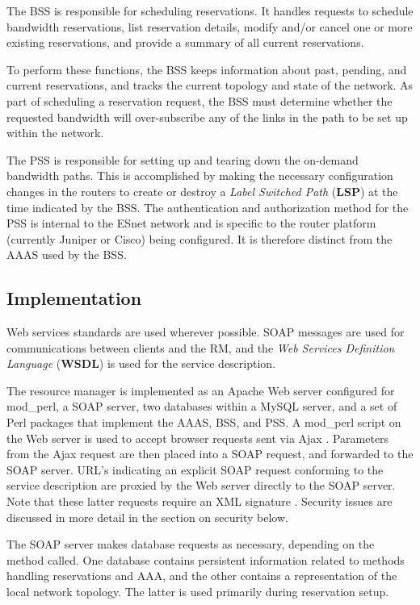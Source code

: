 \documentclass[conference]{IEEEtran}
\begin{document}
The BSS is responsible for scheduling reservations.  It handles
requests to schedule bandwidth reservations, list reservation details,
modify and/or cancel one or more existing reservations, and provide a summary
of all current reservations.

To perform these functions, the BSS keeps information about past,
pending, and current reservations, and tracks the current topology and state of
the network.  As part of scheduling a reservation request, the BSS must
determine whether the requested bandwidth will over-subscribe any of the links
in the path to be set up within the network.

The PSS is responsible for setting up and tearing down the on-demand bandwidth 
paths. This is accomplished by making the necessary configuration changes in 
the routers to create or destroy a \emph{Label Switched Path }(\textbf{LSP}) at the time
indicated by the BSS. The authentication and authorization method for the PSS 
is internal to the ESnet network and is specific to the router platform 
(currently Juniper or Cisco) being configured.  It is therefore distinct from 
the AAAS used by the BSS.

\subsection{Implementation}

Web services standards are used wherever possible.  SOAP \cite{SOAP} messages are
used for communications between clients and the RM, and 
the \emph{Web Services Definition Language} (\textbf{WSDL}) \cite{WSDL} is used for the service description.
 
The resource manager is implemented as an Apache Web server configured for
mod\_perl, a SOAP server, two databases within a MySQL server, and a set of 
Perl packages that implement the AAAS, BSS, and PSS.  A mod\_perl script on
the Web server is used to accept browser requests sent via Ajax \cite{Ajax}.
Parameters from the Ajax request are then placed into a SOAP request, and
forwarded to the SOAP server.
URL's indicating an explicit SOAP request conforming to the service 
description are proxied by the Web server directly to the SOAP server.
Note that these latter requests require an XML signature \cite{XML-Signature}.
Security issues are discussed in more detail in the section on security below.

The SOAP server makes database requests as necessary, depending on the
method called.  One database 
contains persistent information related to methods handling 
reservations and AAA, and the other contains a representation of the local
network topology.  The latter is used primarily during reservation setup.
\end{document}
